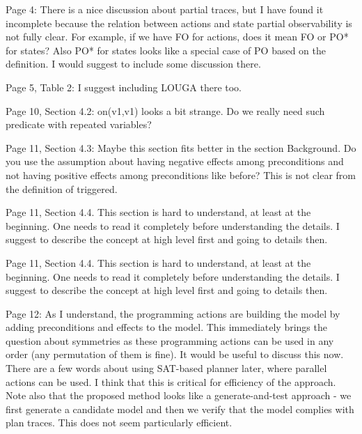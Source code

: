 \documentclass{article}
\begin{document}
\begin{mdframed}[hidealllines=true,backgroundcolor=gray!20]
  Page 4: There is a nice discussion about partial traces, but I have found it incomplete because the relation between actions and state partial observability is not fully clear. For example, if we have FO for actions, does it mean FO or PO* for states? Also PO* for states looks like a special case of PO based on the definition. I would suggest to include some discussion there.
\end{mdframed}


\begin{mdframed}[hidealllines=true,backgroundcolor=gray!20]
  Page 5, Table 2: I suggest including LOUGA there too.
\end{mdframed}

\begin{mdframed}[hidealllines=true,backgroundcolor=gray!20]
  Page 10, Section 4.2: on(v1,v1) looks a bit strange. Do we really need such predicate with repeated variables?
\end{mdframed}

\begin{mdframed}[hidealllines=true,backgroundcolor=gray!20]
  Page 11, Section 4.3: Maybe this section fits better in the section Background. Do you use the assumption about having negative effects among preconditions and not having positive effects among preconditions like before? This is not clear from the definition of triggered.
\end{mdframed}

\begin{mdframed}[hidealllines=true,backgroundcolor=gray!20]
  Page 11, Section 4.4. This section is hard to understand, at least at the beginning. One needs to read it completely before understanding the details. I suggest to describe the concept at high level first and going to details then.
\end{mdframed}

\begin{mdframed}[hidealllines=true,backgroundcolor=gray!20]
  Page 11, Section 4.4. This section is hard to understand, at least at the beginning. One needs to read it completely before understanding the details. I suggest to describe the concept at high level first and going to details then.
\end{mdframed}

\begin{mdframed}[hidealllines=true,backgroundcolor=gray!20]
  Page 12: As I understand, the programming actions are building the model by adding preconditions and effects to the model. This immediately brings the question about symmetries as these programming actions can be used in any order (any permutation of them is fine). It would be useful to discuss this now. There are a few words about using SAT-based planner later, where parallel actions can be used. I think that this is critical for efficiency of the approach. Note also that the proposed method looks like a generate-and-test approach - we first generate a candidate model and then we verify that the model complies with plan traces. This does not seem particularly efficient.
\end{mdframed}
\end{document}
